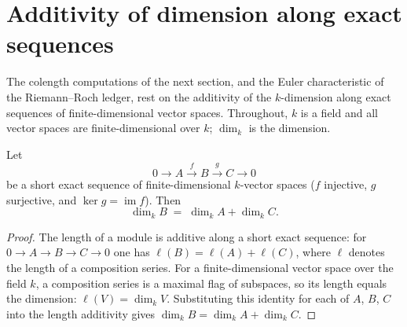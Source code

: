 \section{Additivity of dimension along exact sequences}
\label{pa-sec:finrank_additivity}

The colength computations of the next section, and the Euler characteristic of the
Riemann--Roch ledger, rest on the additivity of the \(k\)-dimension along exact sequences of
finite-dimensional vector spaces. Throughout, \(k\) is a field and all vector spaces are
finite-dimensional over \(k\); \(\dim_k\) is the dimension.

\begin{theorem}
  \label{pa-thm:finrank_add_of_exact}
  \leanok

  Let
  \[
    0 \longrightarrow A \xrightarrow{\ f\ } B \xrightarrow{\ g\ } C \longrightarrow 0
  \]
  be a short exact sequence of finite-dimensional \(k\)-vector spaces (\(f\) injective, \(g\)
  surjective, and \(\ker g = \operatorname{im} f\)). Then
  \[
    \dim_k B \;=\; \dim_k A + \dim_k C .
  \]
\end{theorem}
\begin{proof}
  \leanok
  The length of a module is additive along a short exact sequence: for
  \(0 \to A \to B \to C \to 0\) one has \(\ell(B) = \ell(A) + \ell(C)\), where \(\ell\) denotes
  the length of a composition series. For a finite-dimensional vector space over the field
  \(k\), a composition series is a maximal flag of subspaces, so its length equals the
  dimension: \(\ell(V) = \dim_k V\). Substituting this identity for each of \(A\), \(B\),
  \(C\) into the length additivity gives \(\dim_k B = \dim_k A + \dim_k C\).
\end{proof}

